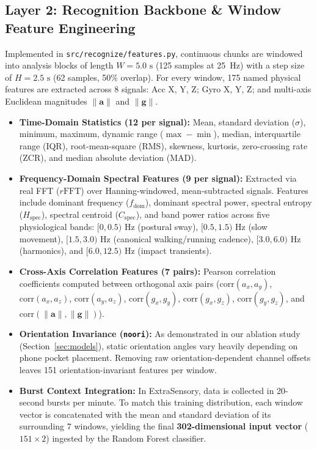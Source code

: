 \documentclass[11pt,a4paper]{article}
\begin{document}
\subsection{Layer 2: Recognition Backbone \& Window Feature Engineering}
Implemented in \texttt{src/recognize/features.py}, continuous chunks are windowed into analysis blocks of length $W = 5.0\text{ s}$ (125 samples at 25~Hz) with a step size of $H = 2.5\text{ s}$ (62 samples, 50\% overlap). For every window, 175 named physical features are extracted across 8 signals: Acc X, Y, Z; Gyro X, Y, Z; and multi-axis Euclidean magnitudes $\|\mathbf{a}\|$ and $\|\mathbf{g}\|$.
\begin{itemize}[leftmargin=1.5em,noitemsep,topsep=2pt]
  \item \textbf{Time-Domain Statistics (12 per signal):} Mean, standard deviation ($\sigma$), minimum, maximum, dynamic range ($\max - \min$), median, interquartile range (IQR), root-mean-square (RMS), skewness, kurtosis, zero-crossing rate (ZCR), and median absolute deviation (MAD).
  \item \textbf{Frequency-Domain Spectral Features (9 per signal):} Extracted via real FFT ($r\text{FFT}$) over Hanning-windowed, mean-subtracted signals. Features include dominant frequency ($f_{\text{dom}}$), dominant spectral power, spectral entropy ($H_{\text{spec}}$), spectral centroid ($C_{\text{spec}}$), and band power ratios across five physiological bands: $[0, 0.5)\text{ Hz}$ (postural sway), $[0.5, 1.5)\text{ Hz}$ (slow movement), $[1.5, 3.0)\text{ Hz}$ (canonical walking/running cadence), $[3.0, 6.0)\text{ Hz}$ (harmonics), and $[6.0, 12.5)\text{ Hz}$ (impact transients).
  \item \textbf{Cross-Axis Correlation Features (7 pairs):} Pearson correlation coefficients computed between orthogonal axis pairs ($\text{corr}(a_x, a_y)$, $\text{corr}(a_x, a_z)$, $\text{corr}(a_y, a_z)$, $\text{corr}(g_x, g_y)$, $\text{corr}(g_x, g_z)$, $\text{corr}(g_y, g_z)$, and $\text{corr}(\|\mathbf{a}\|, \|\mathbf{g}\|)$).
  \item \textbf{Orientation Invariance (\texttt{noori}):} As demonstrated in our ablation study (Section~\ref{sec:models}), static orientation angles vary heavily depending on phone pocket placement. Removing raw orientation-dependent channel offsets leaves 151 orientation-invariant features per window.
  \item \textbf{Burst Context Integration:} In ExtraSensory, data is collected in 20-second bursts per minute. To match this training distribution, each window vector is concatenated with the mean and standard deviation of its surrounding 7 windows, yielding the final \textbf{302-dimensional input vector} ($151 \times 2$) ingested by the Random Forest classifier.
\end{itemize}
\end{document}

